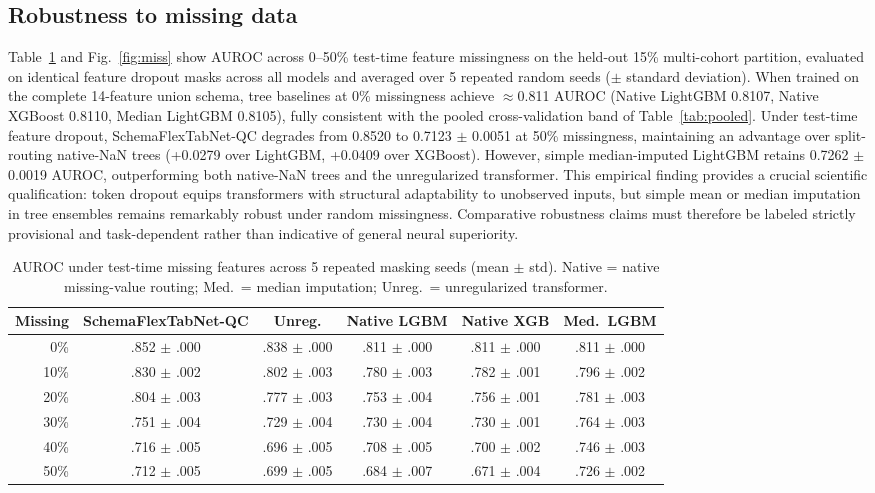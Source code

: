 \documentclass[journal]{IEEEtran}
\newcommand{\sfn}{SchemaFlexTabNet-QC}
\begin{document}
\subsection{Robustness to missing data}
Table~\ref{tab:miss} and Fig.~\ref{fig:miss} show AUROC across 0--50\% test-time feature missingness on the held-out 15\% multi-cohort partition, evaluated on identical feature dropout masks across all models and averaged over 5 repeated random seeds ($\pm$ standard deviation). When trained on the complete 14-feature union schema, tree baselines at 0\% missingness achieve $\approx$0.811 AUROC (Native LightGBM 0.8107, Native XGBoost 0.8110, Median LightGBM 0.8105), fully consistent with the pooled cross-validation band of Table~\ref{tab:pooled}. Under test-time feature dropout, \sfn{} degrades from 0.8520 to 0.7123 $\pm$ 0.0051 at 50\% missingness, maintaining an advantage over split-routing native-NaN trees (+0.0279 over LightGBM, +0.0409 over XGBoost). However, simple median-imputed LightGBM retains 0.7262 $\pm$ 0.0019 AUROC, outperforming both native-NaN trees and the unregularized transformer. This empirical finding provides a crucial scientific qualification: token dropout equips transformers with structural adaptability to unobserved inputs, but simple mean or median imputation in tree ensembles remains remarkably robust under random missingness. Comparative robustness claims must therefore be labeled strictly provisional and task-dependent rather than indicative of general neural superiority.

\begin{table}[t]
\caption{AUROC under test-time missing features across 5 repeated masking seeds (mean $\pm$ std). Native = native missing-value routing; Med.\ = median imputation; Unreg.\ = unregularized transformer.}
\label{tab:miss}
\centering\footnotesize
\setlength{\tabcolsep}{2.5pt}
\begin{tabular}{rccccc}
\toprule
Missing & \sfn{} & Unreg. & Native LGBM & Native XGB & Med.\ LGBM\\
\midrule
0\%  & .852 $\pm$ .000 & .838 $\pm$ .000 & .811 $\pm$ .000 & .811 $\pm$ .000 & .811 $\pm$ .000\\
10\% & .830 $\pm$ .002 & .802 $\pm$ .003 & .780 $\pm$ .003 & .782 $\pm$ .001 & .796 $\pm$ .002\\
20\% & .804 $\pm$ .003 & .777 $\pm$ .003 & .753 $\pm$ .004 & .756 $\pm$ .001 & .781 $\pm$ .003\\
30\% & .751 $\pm$ .004 & .729 $\pm$ .004 & .730 $\pm$ .004 & .730 $\pm$ .001 & .764 $\pm$ .003\\
40\% & .716 $\pm$ .005 & .696 $\pm$ .005 & .708 $\pm$ .005 & .700 $\pm$ .002 & .746 $\pm$ .003\\
50\% & .712 $\pm$ .005 & .699 $\pm$ .005 & .684 $\pm$ .007 & .671 $\pm$ .004 & .726 $\pm$ .002\\
\bottomrule
\end{tabular}
\end{table}
\end{document}
